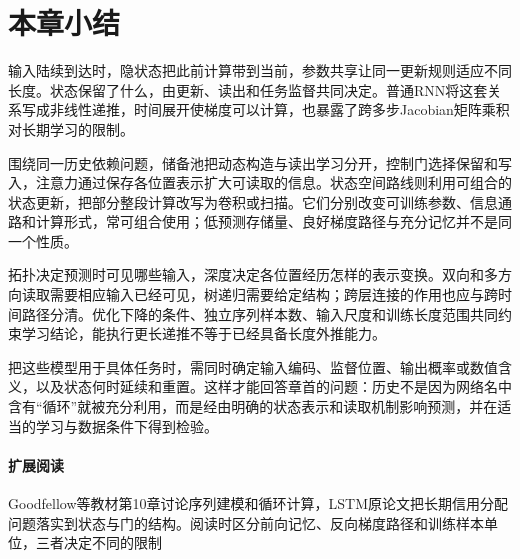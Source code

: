 \Needspace{85mm}
\section{本章小结}
\label{sec:rnn-summary}

输入陆续到达时，隐状态把此前计算带到当前，参数共享让同一更新规则适应不同长度。状态保留了什么，由更新、读出和任务监督共同决定。普通RNN将这套关系写成非线性递推，时间展开使梯度可以计算，也暴露了跨多步Jacobian矩阵乘积对长期学习的限制。

围绕同一历史依赖问题，储备池把动态构造与读出学习分开，控制门选择保留和写入，注意力通过保存各位置表示扩大可读取的信息。状态空间路线则利用可组合的状态更新，把部分整段计算改写为卷积或扫描。它们分别改变可训练参数、信息通路和计算形式，常可组合使用；低预测存储量、良好梯度路径与充分记忆并不是同一个性质。

拓扑决定预测时可见哪些输入，深度决定各位置经历怎样的表示变换。双向和多方向读取需要相应输入已经可见，树递归需要给定结构；跨层连接的作用也应与跨时间路径分清。优化下降的条件、独立序列样本数、输入尺度和训练长度范围共同约束学习结论，能执行更长递推不等于已经具备长度外推能力。

把这些模型用于具体任务时，需同时确定输入编码、监督位置、输出概率或数值含义，以及状态何时延续和重置。这样才能回答章首的问题：历史不是因为网络名中含有“循环”就被充分利用，而是经由明确的状态表示和读取机制影响预测，并在适当的学习与数据条件下得到检验。

\paragraph{扩展阅读}
Goodfellow等教材第10章讨论序列建模和循环计算，LSTM原论文把长期信用分配问题落实到状态与门的结构。阅读时区分前向记忆、反向梯度路径和训练样本单位，三者决定不同的限制
